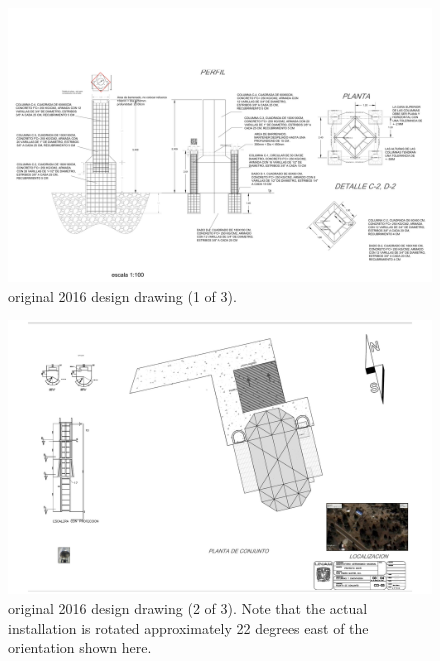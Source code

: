 \begin{figure}
\begin{center}
\includegraphics[height=0.95\linewidth,angle=90]{figures/buildings-ddoti-drawing-2016-1.pdf}
\end{center}
\caption{{\projectname} original 2016 design drawing (1 of 3).}
\label{figure:buildings-drawing-2016-1}
\end{figure}

\begin{figure}
\begin{center}
\includegraphics[height=0.8\linewidth,angle=90]{figures/buildings-ddoti-drawing-2016-2.pdf}
\end{center}
\caption{{\projectname} original 2016 design drawing (2 of 3). Note that the actual installation is rotated approximately 22 degrees east of the orientation shown here.}
\label{figure:buildings-drawing-2016-2}
\end{figure}

